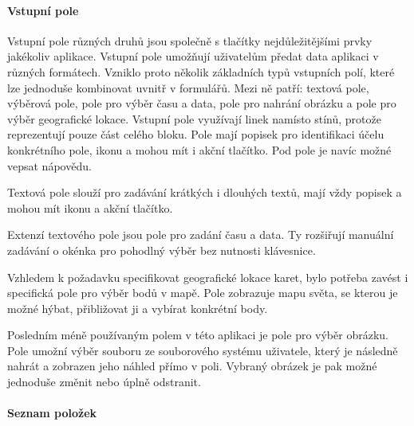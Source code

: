 
			\paragraph{Vstupní pole}

			Vstupní pole různých druhů jsou společně s tlačítky nejdůležitějšími prvky jakékoliv aplikace.
			Vstupní pole umožňují uživatelům předat data aplikaci v různých formátech.
			Vzniklo proto několik základních typů vstupních polí, které lze jednoduše kombinovat uvnitř v formulářů.
			Mezi ně patří: textová pole, výběrová pole, pole pro výběr času a data, pole pro nahrání obrázku a pole pro
			výběr geografické lokace.
			Vstupní pole využívají linek namísto stínů, protože reprezentují pouze část celého bloku.
			Pole mají popisek pro identifikaci účelu konkrétního pole, ikonu a mohou mít i akční tlačítko.
			Pod pole je navíc možné vepsat nápovědu.

			Textová pole slouží pro zadávání krátkých i dlouhých textů, mají vždy popisek a mohou mít ikonu a
			akční tlačítko.


			Extenzí textového pole jsou pole pro zadání času a data.
			Ty rozšiřují manuální zadávání o okénka pro pohodlný výběr bez nutnosti klávesnice.


			Vzhledem k požadavku specifikovat geografické lokace karet, bylo potřeba zavést i specifická pole
			pro výběr bodů v mapě.
			Pole zobrazuje mapu světa, se kterou je možné hýbat, přibližovat ji a vybírat konkrétní body.


			Posledním méně používaným polem v této aplikaci je pole pro výběr obrázku.
			Pole umožní výběr souboru ze souborového systému uživatele, který je následně nahrát a zobrazen jeho náhled
			přímo v poli.
			Vybraný obrázek je pak možné jednoduše změnit nebo úplně odstranit.


			\paragraph{Seznam položek}

